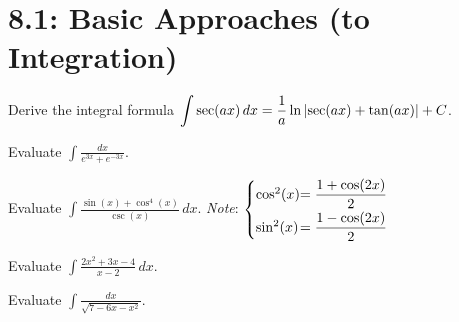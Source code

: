 \documentclass[../mathNotesPreamble]{subfiles}
\begin{document}
  \section{8.1: Basic Approaches (to Integration)}
  \begin{ex*}
    Derive the integral formula $\displaystyle\int \sec(ax)\,dx=\frac{1}{a}\ln{\left\vert\sec(ax)+\tan(ax)\right\vert}+C$.
  \end{ex*}

  \begin{ex*}
    Evaluate $\displaystyle \int \frac{dx}{e^{3x}+e^{-3x}}$.
  \end{ex*}
  \pagebreak

  \begin{ex*}
    Evaluate $\displaystyle \int \frac{\sin(x)+\cos^4(x)}{\csc(x)}\,dx$.
      \textit{Note}: 
      $\begin{cases}
        \cos^2(x)\hspace*{-10pt}&=\dfrac{1+\cos(2x)}{2}\\[5pt]
        \sin^2(x)\hspace*{-10pt}&=\dfrac{1-\cos(2x)}{2}
      \end{cases}$
  \end{ex*}

  \begin{ex*}
    Evaluate $\displaystyle \int \frac{2x^2+3x-4}{x-2}\,dx$.
  \end{ex*}
  \pagebreak

  \begin{ex*}
    Evaluate $\displaystyle \int \frac{dx}{\sqrt{7-6x-x^2}}$.
  \end{ex*}
  \pagebreak
\end{document}
